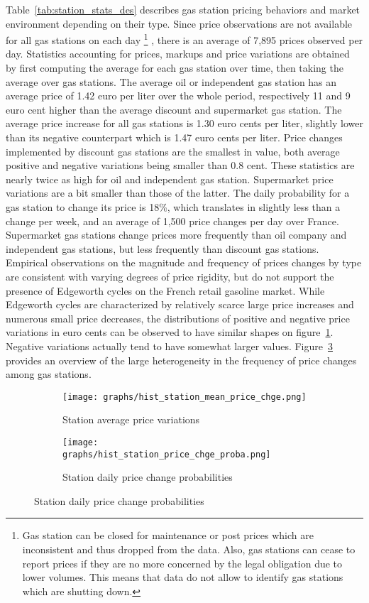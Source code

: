 \documentclass[english]{article}
\begin{document}
Table~\ref{tab:station_stats_des} describes gas station pricing behaviors and market environment depending on their type. Since price observations are not available for all gas stations on each day%
\footnote{Gas station can be closed for maintenance or post prices which are inconsistent and thus dropped from the data. Also, gas stations can cease to report prices if they are no more concerned by the legal obligation due to lower volumes. This means that data do not allow to identify gas stations which are shutting down.}%
, there is an average of 7,895 prices observed per day. Statistics accounting for prices, markups and price variations are obtained by first computing the average for each gas station over time, then taking the average over gas stations. The average oil or independent gas station has an average price of 1.42 euro per liter over the whole period, respectively 11 and 9 euro cent higher than the average discount and supermarket gas station. The average price increase for all gas stations is 1.30 euro cents per liter, slightly lower than its negative counterpart which is 1.47 euro cents per liter. Price changes implemented by discount gas stations are the smallest in value, both average positive and negative variations being smaller than 0.8 cent. These statistics are nearly twice as high for oil and independent gas station. Supermarket price variations are a bit smaller than those of the latter. The daily probability for a gas station to change its price is 18\%, which translates in slightly less than a change per week, and an average of 1,500 price changes per day over France. Supermarket gas stations change prices more frequently than oil company and independent gas stations, but less frequently than discount gas stations. Empirical observations on the magnitude and frequency of prices changes by type are consistent with varying degrees of price rigidity, but do not support the presence of Edgeworth cycles on the French retail gasoline market. While Edgeworth cycles are characterized by relatively scarce large price increases and numerous small price decreases, the distributions of positive and negative price variations in euro cents can be observed to have similar shapes on figure~\ref{fig:hist_station_mean_price_chge}. Negative variations actually tend to have somewhat larger values. Figure~\ref{fig:hist_station_price_chge_proba} provides an overview of the large heterogeneity in the frequency of price changes among gas stations.

\begin{figure}[htb!]
\centering
\caption{Histograms of price change frequencies and values}
\begin{subfigure}{.49\textwidth}
\centering
\texttt{[image: graphs/hist\_station\_mean\_price\_chge.png]}
\caption[short]{Station average price variations}
\label{fig:hist_station_mean_price_chge}
\end{subfigure}
\begin{subfigure}{.49\textwidth}
\centering
\texttt{[image: graphs/hist\_station\_price\_chge\_proba.png]}
\caption[short]{Station daily price change probabilities}
\label{fig:hist_station_price_chge_proba}
\end{subfigure}
\end{figure}
\end{document}
